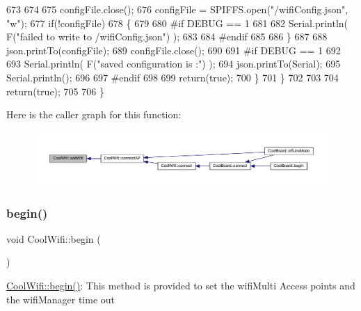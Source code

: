 \begin{DoxyCode}
673             
674 
675             configFile.close();
676             configFile = SPIFFS.open(\textcolor{stringliteral}{"/wifiConfig.json"}, \textcolor{stringliteral}{"w"});
677             \textcolor{keywordflow}{if}(!configFile)
678             \{
679             
680 \textcolor{preprocessor}{            #if DEBUG == 1 }
681 
682                 Serial.println( F(\textcolor{stringliteral}{"failed to write to /wifiConfig.json"}) );
683             
684 \textcolor{preprocessor}{            #endif}
685 
686             \}
687             
688             json.printTo(configFile);
689             configFile.close();
690 
691 \textcolor{preprocessor}{        #if DEBUG == 1 }
692 
693             Serial.println( F(\textcolor{stringliteral}{"saved configuration is :"}) );
694             json.printTo(Serial);
695             Serial.println();
696         
697 \textcolor{preprocessor}{        #endif}
698 
699             \textcolor{keywordflow}{return}(\textcolor{keyword}{true}); 
700         \}
701     \}   
702 
703     
704     \textcolor{keywordflow}{return}(\textcolor{keyword}{true});
705     
706 \}
\end{DoxyCode}
Here is the caller graph for this function\+:\nopagebreak
\begin{figure}[H]
\begin{center}
\leavevmode
\includegraphics[width=350pt]{d7/d29/class_cool_wifi_a914d7a1df14dd6b75345fb614c34e9d6_icgraph}
\end{center}
\end{figure}
\mbox{\label{class_cool_wifi_a46942fed90e475112cc10b78a32e7aaa}} 
\subsubsection{\texorpdfstring{begin()}{begin()}}
{\footnotesize\ttfamily void Cool\+Wifi\+::begin (\begin{DoxyParamCaption}{ }\end{DoxyParamCaption})}

\hyperlink{class_cool_wifi_a46942fed90e475112cc10b78a32e7aaa}{Cool\+Wifi\+::begin()}\+: This method is provided to set the wifi\+Multi Access points and the wifi\+Manager time out 

